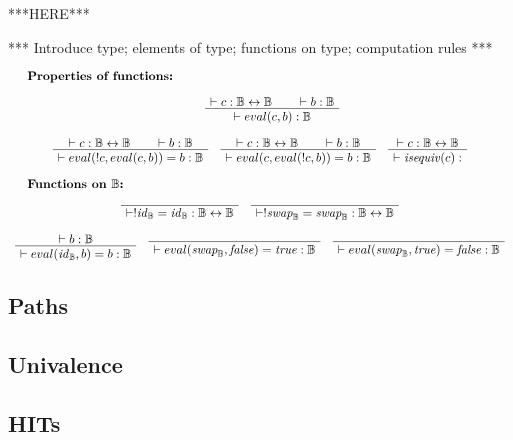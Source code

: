 \documentclass[format=acmlarge,review,natbib]{acmart}
\newcommand{\invc}[1]{!#1}
\newcommand{\evalone}[2]{eval(#1,#2)}
\newcommand{\isequiv}[1]{\mathit{isequiv}(#1)}
\newcommand{\idc}{\mathit{id}_{\boolt}}
\newcommand{\swapc}{\mathit{swap}_{\boolt}}
\newcommand{\iso}{\leftrightarrow}
\newcommand{\fc}{\mathit{false}}
\newcommand{\tc}{\mathit{true}}
\newcommand{\boolt}{\mathbb{B}}
\newcommand{\proves}{\vdash}
\newcommand{\jdg}[2]{\proves #1 : #2}
\begin{document}
***HERE***

*** Introduce type; elements of type; functions on type; computation rules ***

\[\begin{array}{c}
    \noalign{\textbf{Properties of functions:}} \\
    \quad
    \quad
    \AxiomC{$\jdg{c}{\boolt\iso\boolt}$}
    \AxiomC{$\jdg{b}{\boolt}$}
    \BinaryInfC{$\jdg{\evalone{c}{b}}{\boolt}$}
    \DisplayProof
    \\
    \\
    \AxiomC{$\jdg{c}{\boolt\iso\boolt}$}
    \AxiomC{$\jdg{b}{\boolt}$}
    \BinaryInfC{$\jdg{\evalone{\invc{c}}{\evalone{c}{b}} = b}{\boolt}$}
    \DisplayProof
    \quad
    \AxiomC{$\jdg{c}{\boolt\iso\boolt}$}
    \AxiomC{$\jdg{b}{\boolt}$}
    \BinaryInfC{$\jdg{\evalone{c}{\evalone{\invc{c}}{b}} = b}{\boolt}$}
    \DisplayProof
    \quad
    \AxiomC{$\jdg{c}{\boolt\iso\boolt}$}
    \UnaryInfC{$\jdg{\isequiv{c}}{}$}
    \DisplayProof
    \\
    \\
    \noalign{\textbf{Functions on $\boolt$:}} \\
    \AxiomC{}
    \UnaryInfC{$\jdg{\invc{\idc = \idc}}{\boolt\iso\boolt}$}
    \DisplayProof
    \quad
    \AxiomC{}
    \UnaryInfC{$\jdg{\invc{\swapc } = \swapc }{\boolt\iso\boolt}$}
    \DisplayProof
    \\
    \\
    \AxiomC{$\jdg{b}{\boolt}$}
    \UnaryInfC{$\jdg{\evalone{\idc}{b} = b}{\boolt}$}
    \DisplayProof
    \quad
    \AxiomC{}
    \UnaryInfC{$\jdg{\evalone{\swapc}{\fc} = \tc}{\boolt}$}
    \DisplayProof
    \quad
    \AxiomC{}
    \UnaryInfC{$\jdg{\evalone{\swapc}{\tc} = \fc}{\boolt}$}
    \DisplayProof
\end{array}\]

\subsection{Paths}

\subsection{Univalence}

\subsection{HITs}

\newpage
\end{document}

